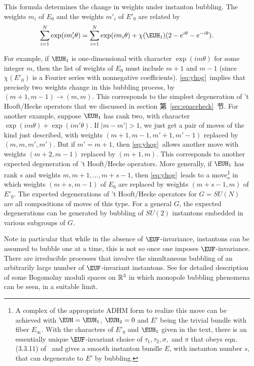 This formula determines the change in weights under instanton
bubbling.  The weights $m_i$ of $E_0$ and the weights $m'_i$ of
$E'_0$ are related by
\setcounter{equation}{12}
\begin{equation}\label{eq:yhog}
\sum_{i=1}^N\exp({im'_i\theta})=
\sum_{i=1}^N\exp({im_i\theta})+\chi({{\EUH}}_1)(2-e^{i\theta}-e^{-i\theta}).
\end{equation}

 For example, if ${{\EUH}}_1$ is
one-dimensional with character $\exp(im\theta)$ for some integer
$m$, then the list of weights of $E_0$ must include $m+1$ and
$m-1$ (since $\chi(E'_0)$ is a Fourier series with nonnegative
coefficients). \eqref{eq:yhog}\ implies that precisely two weights change in
this bubbling process, by $(m+1,m-1)\to (m,m)$. This corresponds
to the simplest degeneration of 't Hooft/Hecke operators that we
discussed in section 第~\ref{sec:spaceheck}~节. For another example, suppose
${{\EUH}}_1$ has rank two, with character $\exp({im
\theta})+\exp({im'\theta})$.  If $|m-m'|>1$, we just get a pair of
moves of the kind just described, with weights
$(m+1,m-1,m'+1,m'-1)$ replaced by $(m,m,m',m')$. But if $m'=m+1$,
then \eqref{eq:yhog}\ allows another move with weights $(m+2,m-1)$ replaced
by $(m+1,m)$. This corresponds to another expected degeneration of
't Hooft/Hecke operators. More generally, if ${{\EUH}}_1$ has rank
$s$ and weights $m,m+1,\dots,m+s-1$, then \eqref{eq:yhog}\ leads to a
move\footnote{A complex of the appropriate ADHM form to realize this
move can be achieved with ${{\EUH}}={{\EUH}}_1$, ${{\EUH}}_2=0$
and $E'$ being the trivial bundle with fiber $E_\infty$. With the
characters of $E'_0$ and ${{\EUH}}_1$ given in the text, there is
an essentially unique ${\EUF}$-invariant choice of
$\tau_1,\tau_2,\sigma,$ and $\pi$ that obeys eqn. (3.3.11) of
\cite{ref126}\ and gives a smooth instanton bundle $E$, with instanton
number $s$, that can degenerate to $E'$ by bubbling.} in which
weights $(m+s,m-1)$ of $E_0$ are replaced by weights $(m+s-1,m)$
of $E'_0$. The expected degenerations of 't Hooft/Hecke operators
for $G=SU(N)$ are all compositions of moves of this type.  For a
general $G$, the expected degenerations can be generated by
bubbling of $SU(2)$ instantons embedded in various subgroups of
$G$.

Note in particular that while in the absence of
${\EUF}$-invariance, instantons can be assumed to bubble one at a
time, this is not so once one imposes ${\EUF}$-invariance. There
are irreducible processes that involve the simultaneous bubbling
of an arbitrarily large number of ${\EUF}$-invariant instantons.
See \cite{ref112,ref113} for detailed description of some
Bogomolny moduli spaces on $\Bbb{R}^3$ in which monopole bubbling
phenomena can be seen, in a suitable limit.

